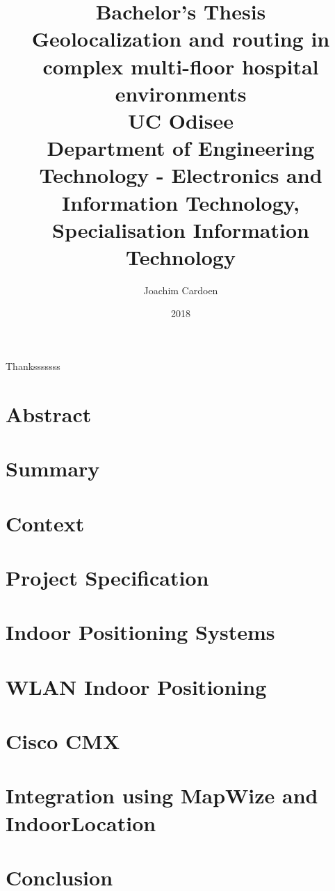 \documentclass[11pt,twoside]{report}
\title{
    {\large Bachelor's Thesis}\\
    {Geolocalization and routing in complex multi-floor hospital environments}\\
    {\large UC Odisee}\\
    {\large Department of Engineering Technology - Electronics and Information Technology, Specialisation Information Technology}
}
\author{Joachim Cardoen}
\date{2018}
\begin{document}
\begin{titlepage}
\maketitle
\end{titlepage}
\begin{center}
Thanksssssss
\end{center}
\chapter*{Abstract}
\tableofcontents
\clearpage
\printglossary[type=\acronymtype]
\printglossary
\chapter{Summary}
\chapter{Context}
\chapter{Project Specification}

\chapter{Indoor Positioning Systems}

\chapter{WLAN Indoor Positioning}

\chapter{Cisco CMX}

\chapter{Integration using MapWize and IndoorLocation}

\chapter{Conclusion}


\newpage
\printbibliography
\end{document}
